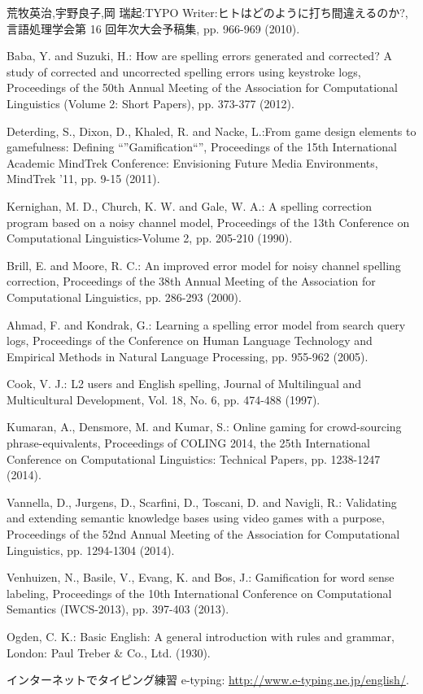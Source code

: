  \begin{thebibliography}{99}
	 荒牧英治,宇野良子,岡 瑞起:TYPO Writer:ヒトはどのように打ち間違えるのか?,言語処理学会第 16 回年次大会予稿集, pp. 966-969 (2010).
	
	 Baba, Y. and Suzuki, H.: How are spelling errors generated and corrected? A study of corrected and uncorrected spelling errors using keystroke logs, Proceedings of the 50th Annual Meeting of the Association for Computational Linguistics (Volume 2: Short Papers), pp. 373-377 (2012).

	 Deterding, S., Dixon, D., Khaled, R. and Nacke, L.:From game design elements to gamefulness: Defining “”Gamification“”, Proceedings of the 15th International Academic MindTrek Conference: Envisioning Future Media Environments, MindTrek ’11, pp. 9-15 (2011).

	 Kernighan, M. D., Church, K. W. and Gale, W. A.: A spelling correction program based on a noisy channel model, Proceedings of the 13th Conference on Computational Linguistics-Volume 2, pp. 205-210 (1990).

	 Brill, E. and Moore, R. C.: An improved error model for noisy channel spelling correction, Proceedings of the 38th Annual Meeting of the Association for Computational Linguistics, pp. 286-293 (2000).

	 Ahmad, F. and Kondrak, G.: Learning a spelling error model from search query logs, Proceedings of the Conference on Human Language Technology and Empirical Methods in Natural Language Processing, pp. 955-962 (2005).

	 Cook, V. J.: L2 users and English spelling, Journal of Multilingual and Multicultural Development, Vol. 18, No. 6, pp. 474-488 (1997).

	 Kumaran, A., Densmore, M. and Kumar, S.: Online gaming for crowd-sourcing phrase-equivalents, Proceedings of COLING 2014, the 25th International Conference on Computational Linguistics: Technical Papers, pp. 1238-1247 (2014).

	 Vannella, D., Jurgens, D., Scarfini, D., Toscani, D. and Navigli, R.: Validating and extending semantic knowledge bases using video games with a purpose, Proceedings of the 52nd Annual Meeting of the Association for Computational Linguistics, pp. 1294-1304 (2014).

	 Venhuizen, N., Basile, V., Evang, K. and Bos, J.: Gamification for word sense labeling, Proceedings of the 10th International Conference on Computational Semantics (IWCS-2013), pp. 397-403 (2013).

	 Ogden, C. K.: Basic English: A general introduction with rules and grammar, London: Paul Treber \& Co., Ltd. (1930).
	
	 インターネットでタイピング練習 e-typing: \url{http://www.e-typing.ne.jp/english/}.


 \end{thebibliography}



